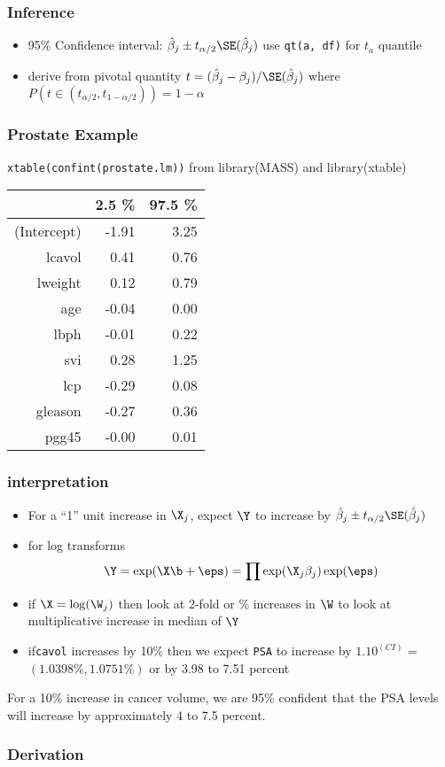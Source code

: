 \documentclass{beamer}
\begin{document}
\begin{frame}
  \frametitle{Inference}
\vspace{-.5in}

  \begin{itemize}
  \item 
   95\% Confidence interval:  $\hat{\beta}_j \pm t_{\alpha/2}
   \SE(\hat{\beta}_j)$  \pause use {\tt qt(a, df)} for $t_a$ quantile
\item derive from pivotal quantity $t = (\hat{\beta}_j -
  \beta_j)/\SE(\hat{\beta}_j)$ where 
 $P(t \in (t_{\alpha/2}, t_{1 - \alpha/2}))  = 1 -\alpha$
  \end{itemize}

\vfill

\end{frame}
\begin{frame}\frametitle{Prostate Example}
{\tt xtable(confint(prostate.lm))}  from library(MASS) and library(xtable)
  \begin{table}[ht]
\centering
\begin{tabular}{rrr}
  \hline
 & 2.5 \% & 97.5 \% \\ 
  \hline
(Intercept) & -1.91 & 3.25 \\ 
  lcavol & 0.41 & 0.76 \\ 
  lweight & 0.12 & 0.79 \\ 
  age & -0.04 & 0.00 \\ 
  lbph & -0.01 & 0.22 \\ 
  svi & 0.28 & 1.25 \\ 
  lcp & -0.29 & 0.08 \\ 
  gleason & -0.27 & 0.36 \\ 
  pgg45 & -0.00 & 0.01 \\ 
   \hline
\end{tabular}
\end{table}
\end{frame}
\begin{frame} \frametitle{interpretation}
  \begin{itemize}
  \item 
  For a ``1'' unit increase in $\X_j$, expect $\Y$ to increase by $\hat{\beta}_j \pm t_{\alpha/2}
   \SE(\hat{\beta}_j)$ 
\item for log transforms
$$\Y = \exp(\X\b + \eps) = \prod \exp(\X_j \beta_j) \exp(\eps)$$
\item if $\X = \log(\W_j)$ then look at 2-fold or \%
  increases in $\W$ to look at multiplicative increase in median of $\Y$
\item if{\tt  cavol} increases by 10\%  then we expect {\tt PSA} to increase
  by $1.10^{(CI)}$  = $( 1.0398 \%, 1.0751 \%)$ or by 3.98 to 7.51 percent
  \end{itemize}
For a 10\% increase in cancer volume, we are 95\% confident  that the PSA levels
will increase by approximately 4 to 7.5 percent.
\end{frame}
\begin{frame}\frametitle{Derivation}
  
\end{frame}
\end{document}
